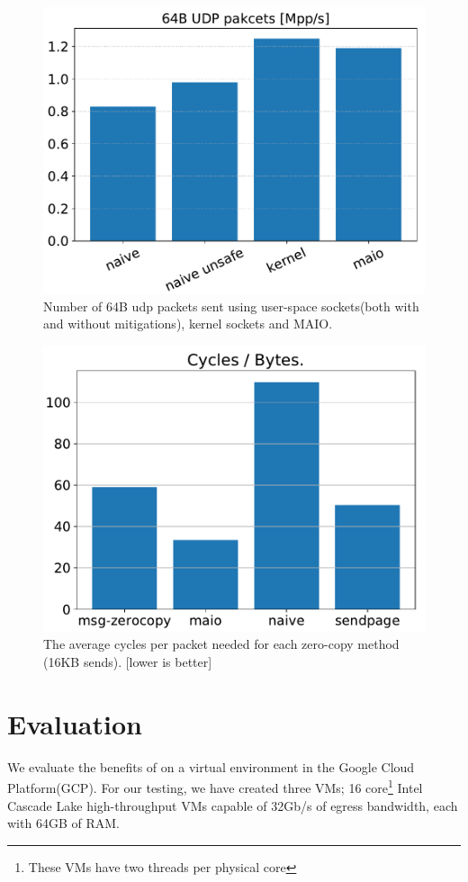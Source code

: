 \begin{figure}[t]
    \centering
    \includegraphics[width=\columnwidth]{syscall.pdf}
    \caption{Number of 64B udp packets sent using user-space sockets(both with and without mitigations), kernel sockets and MAIO.} 
    \label{fig:pps}
\end{figure}
\begin{figure}[t]
    \centering
    \includegraphics[width=\columnwidth]{send.pdf}
    \caption{The average cycles per packet needed for each zero-copy method (16KB sends). [lower is better]}
    \label{fig:tx_compare}
\end{figure}
\section{Evaluation}\label{sec:eval}
We evaluate the benefits of \oursys on a virtual environment in the Google Cloud Platform(GCP).
For our testing, we have created three VMs; 16 core\footnote{These VMs have two threads per physical core} Intel Cascade Lake high-throughput VMs capable of 32Gb/s of egress bandwidth\cite{gcp}, each with 64GB of RAM.


